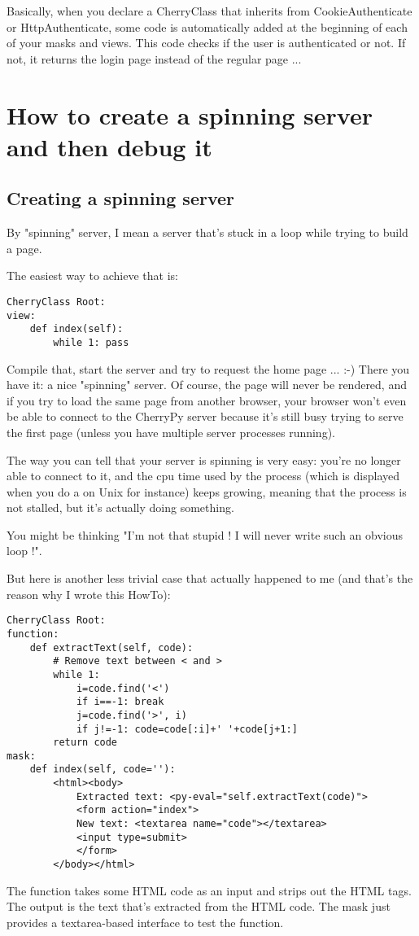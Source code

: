 \documentclass{manual}
\begin{document}
Basically, when you declare a CherryClass that inherits from CookieAuthenticate or HttpAuthenticate, some code is
automatically added at the beginning of each of your masks and views. This code checks if the user is authenticated
or not. If not, it returns the login page instead of the regular page ...

\chapter{How to create a spinning server and then debug it}

\section{Creating a spinning server}
By "spinning" server, I mean a server that's stuck in a loop while trying to build a page.

The easiest way to achieve that is:
\begin{verbatim}
CherryClass Root:
view:
    def index(self):
        while 1: pass
\end{verbatim}
Compile that, start the server and try to request the home page ... :-) There you have it: a nice "spinning" server. Of course,
the page will never be rendered, and if you try to load the same page from another browser, your browser won't even be able to
connect to the CherryPy server because it's still busy trying to serve the first page (unless you have multiple server
processes running).

The way you can tell that your server is spinning is very easy: you're no longer able to connect to it, and the cpu time used
by the process (which is displayed when you do a  on Unix for instance) keeps growing, meaning that the
process is not stalled, but it's actually doing something.

You might be thinking "I'm not that stupid ! I will never write such an obvious loop !".

But here is another less trivial case that actually happened to me (and that's the reason why I wrote this HowTo):
\begin{verbatim}
CherryClass Root:
function:
    def extractText(self, code):
        # Remove text between < and >
        while 1:
            i=code.find('<')
            if i==-1: break
            j=code.find('>', i)
            if j!=-1: code=code[:i]+' '+code[j+1:]
        return code
mask:
    def index(self, code=''):
        <html><body>
            Extracted text: <py-eval="self.extractText(code)">
            <form action="index">
            New text: <textarea name="code"></textarea>
            <input type=submit>
            </form>
        </body></html>
\end{verbatim}
The  function takes some HTML code as an input and strips out the HTML tags. The output is the text
that's extracted from the HTML code. The  mask just provides a textarea-based interface to test the function.
\end{document}
